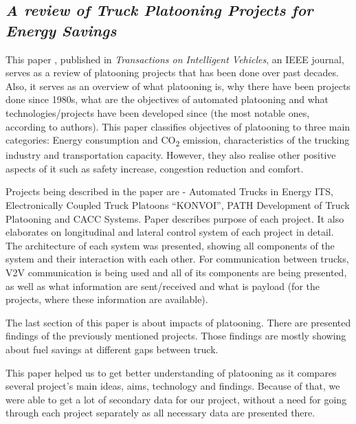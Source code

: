 \subsection{\textit{A review of Truck Platooning Projects for Energy Savings}}

This paper \cite{Tsugawa2016ASavings}, published in \emph{Transactions on Intelligent Vehicles}, an \acrshort{IEEE} journal, serves as a review of platooning projects that has been done over past decades. Also, it serves as an overview of what platooning is, why there have been projects done since 1980s, what are the objectives of automated platooning and what technologies/projects have been developed since (the most notable ones, according to authors).
This paper classifies objectives of platooning to three main categories: Energy consumption and CO\textsubscript{2} emission, characteristics of the trucking industry and transportation capacity. However, they also realise other positive aspects of it such as safety increase, congestion reduction and comfort.\par
% 
Projects being described in the paper are - Automated Trucks in Energy ITS, Electronically Coupled Truck Platoons “KONVOI”, PATH Development of Truck Platooning and \acrfull{CACC} Systems. Paper describes purpose of each project. It also elaborates on longitudinal and lateral control system of each project in detail. The architecture of each system was presented, showing all components of the system and their interaction with each other. For communication between trucks, \acrshort{V2V} communication is being used and all of its components are being presented, as well as what information are sent/received and what is payload (for the projects, where these information are available).\par
% 
The last section of this paper is about impacts of platooning. There are presented findings of the previously mentioned projects. Those findings are mostly showing about fuel savings at different gaps between truck.\par
% 
This paper helped us to get better understanding of platooning as it compares several project’s main ideas, aims, technology and findings. Because of that, we were able to get a lot of secondary data for our project, without a need for going through each project separately as all necessary data are presented there.
